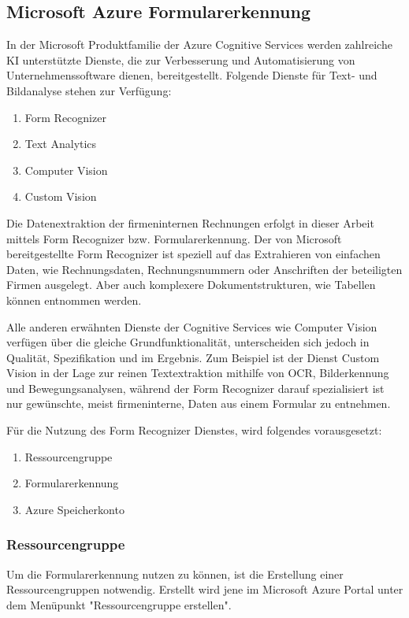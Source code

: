 \subsection{Microsoft Azure Formularerkennung}

In der Microsoft Produktfamilie der Azure Cognitive Services werden zahlreiche KI unterstützte Dienste, die zur Verbesserung
und Automatisierung von Unternehmenssoftware dienen, bereitgestellt. Folgende Dienste für Text- und Bildanalyse stehen zur Verfügung:

\begin{enumerate}
    \item Form Recognizer
    \item Text Analytics
    \item Computer Vision
    \item Custom Vision
\end{enumerate}

Die Datenextraktion der firmeninternen Rechnungen erfolgt in dieser Arbeit mittels Form Recognizer bzw. Formularerkennung.
Der von Microsoft bereitgestellte Form Recognizer ist speziell auf das Extrahieren von einfachen Daten, wie Rechnungsdaten,
Rechnungsnummern oder Anschriften der beteiligten Firmen ausgelegt. Aber auch komplexere Dokumentstrukturen, wie Tabellen können entnommen
werden.

Alle anderen erwähnten Dienste der Cognitive Services wie Computer Vision verfügen über die gleiche Grundfunktionalität, unterscheiden
sich jedoch in Qualität, Spezifikation und im Ergebnis. Zum Beispiel ist der Dienst Custom Vision in der Lage zur reinen Textextraktion mithilfe von OCR,
Bilderkennung und Bewegungsanalysen, während der Form Recognizer darauf spezialisiert ist nur gewünschte, meist firmeninterne, Daten aus einem Formular zu entnehmen.

Für die Nutzung des Form Recognizer Dienstes, wird folgendes vorausgesetzt:
\begin{enumerate}
    \item Ressourcengruppe
    \item Formularerkennung
    \item Azure Speicherkonto
\end{enumerate}

\subsubsection{Ressourcengruppe}
Um die Formularerkennung nutzen zu können, ist die Erstellung einer Ressourcengruppen notwendig. Erstellt wird jene im Microsoft Azure Portal unter dem Menüpunkt "Ressourcengruppe erstellen".

